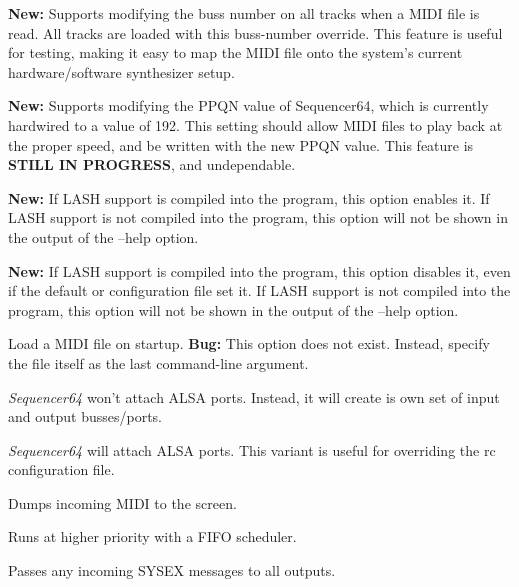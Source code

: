       \textbf{New:}
      Supports modifying the buss number on all tracks when a MIDI file is
      read.  All tracks are loaded with this buss-number override.  This
      feature is useful for testing, making it easy to map the MIDI file onto
      the system's current hardware/software synthesizer setup.

      \textbf{New:}
      Supports modifying the PPQN value of Sequencer64, which is currently
      hardwired to a value of 192.  This setting should allow MIDI files to
      play back at the proper speed, and be written with the new PPQN value.
      This feature is \textbf{STILL IN PROGRESS}, and undependable.

      \textbf{New:}
      If LASH support is compiled into the program, this option
      enables it.
      If LASH support is not compiled into the program, this option will not
      be shown in the output of the --help option.

      \textbf{New:}
      If LASH support is compiled into the program, this option
      disables it, even if the default or configuration file set it.
      If LASH support is not compiled into the program, this option will not
      be shown in the output of the --help option.

      Load a MIDI file on startup.
      \textbf{Bug:}
      This option does not exist.
      Instead, specify the file itself as the last command-line argument.

      \textsl{Sequencer64} won't attach ALSA ports.
      Instead, it will create is own set of input and output busses/ports.

      \textsl{Sequencer64} will attach ALSA ports.
      This variant is useful for overriding the rc configuration file.

      Dumps incoming MIDI to the screen.

      Runs at higher priority with a FIFO scheduler.

      Passes any incoming SYSEX messages to all outputs.

